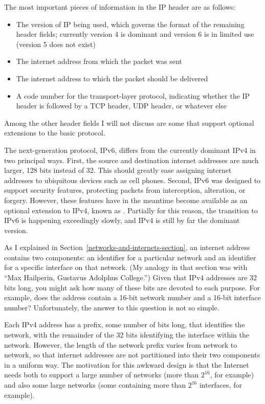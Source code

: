 The most important pieces of information in
the IP header are as follows:
\begin{itemize}
\item
The version of IP being used, which governs the format of the
remaining header fields; currently version 4 is dominant and version 6
is in limited use (version 5 does not exist)
\item
The internet address from which the packet was sent
\item
The internet address to which the packet should be delivered
\item
A code number for the transport-layer protocol, indicating whether the
IP header is followed by a TCP header, UDP header, or whatever else
\end{itemize}
Among the other header fields I will not discuss are some that support
optional extensions to the basic protocol.

The next-generation protocol, IPv6, differs from the currently dominant
IPv4 in two principal ways.  First, the source and destination
internet addresses are much larger, 128 bits instead of 32.  This
should greatly ease assigning internet addresses to ubiquitous devices
such as cell phones.  Second, IPv6 was designed to support security
features, protecting packets from interception, alteration, or
forgery.  However, these features have in the meantime become
available as an optional extension to IPv4, known as .
Partially for this reason, the transition to IPv6 is happening
exceedingly slowly, and IPv4 is still by far the dominant version.

As I explained in Section~\ref{networks-and-internets-section}, an
internet address contains two components: an identifier for a
particular network and an identifier for a specific interface on that
network.  (My analogy in that section was with ``Max Hailperin,
Gustavus Adolphus College.'')  Given that IPv4 addresses are 32 bits
long, you might ask how many of these bits are devoted to each
purpose.  For example, does the address contain a 16-bit network
number and a 16-bit interface number?  Unfortunately, the answer to
this question is not so simple.

Each IPv4 address has a prefix, some number of bits long, that
identifies the network, with the remainder of the 32 bits identifying
the interface within the network.  However, the length of the network
prefix varies from network to network, so that internet addresses are
not partitioned into their two components in a uniform way.
The motivation for this awkward design is that the Internet needs both
to support a large number of networks (more than $2^{16}$, for example)
and also some large networks (some containing more than $2^{16}$
interfaces, for example).

